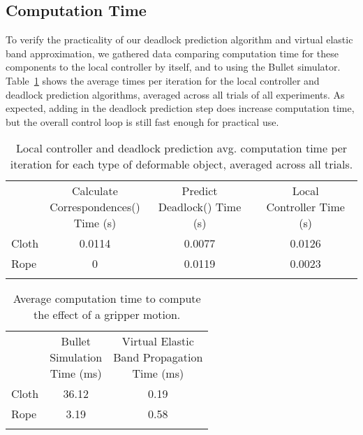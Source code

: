 \subsection{Computation Time}




To verify the practicality of our deadlock prediction algorithm and virtual elastic band approximation, we gathered data comparing computation time for these components to the local controller by itself, and to using the Bullet simulator. Table~\ref{tab:control_statistics} shows the average times per iteration for the local controller and deadlock prediction algorithms, averaged across all trials of all experiments. As expected, adding in the deadlock prediction step does increase computation time, but the overall control loop is still fast enough for practical use.

\begin{table}[t]
\centering
\caption{Local controller and deadlock prediction avg. computation time per iteration for each type of deformable object, averaged across all trials.}
\label{tab:control_statistics}
\begin{tabular}{lccc}
\noalign{\smallskip}\hline\noalign{\smallskip}
& 
\parbox{1.04in}{\centering Calculate\\Correspondences()\\Time (s)} &
\parbox{0.62in}{\centering Predict\\Deadlock() Time (s)} &
\parbox{0.64in}{\centering Local\\Controller Time (s)} \\
\noalign{\smallskip}\hline\noalign{\smallskip}
Cloth   & 0.0114 & 0.0077 & 0.0126 \\
Rope    & 0      & 0.0119 & 0.0023 \\
\noalign{\smallskip}\hline
\end{tabular}
\end{table}

\begin{table}[t]
\centering
\caption{Average computation time to compute the effect of a gripper motion.}
\label{tab:prediction_statistics}
\begin{tabular}{lcc}
\noalign{\smallskip}\hline\noalign{\smallskip}
& 
\parbox{0.7in}{\centering Bullet\\Simulation\\Time (ms)} &
\parbox{1.1in}{\centering Virtual Elastic\\Band Propagation\\Time (ms)} \\
\noalign{\smallskip}\hline\noalign{\smallskip}
Cloth   & 36.12 & 0.19 \\
Rope    &  3.19 & 0.58 \\
\noalign{\smallskip}\hline
\end{tabular}
\end{table}

